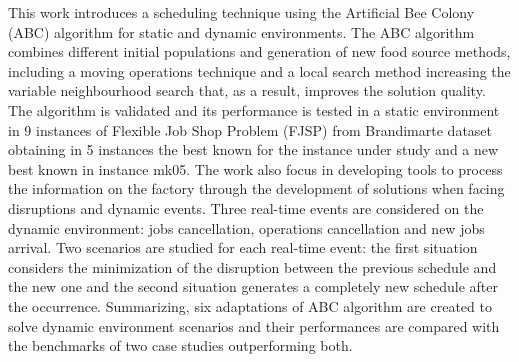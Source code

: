 
This work introduces a scheduling technique using the Artificial Bee Colony (ABC) algorithm for static and dynamic environments.
The ABC algorithm combines different initial populations and generation of new food source methods, including a moving operations technique and a local search method increasing the variable neighbourhood search that, as a result, improves the solution quality. The algorithm is validated and its performance is tested in a static environment in 9 instances of Flexible Job Shop Problem (FJSP) from Brandimarte dataset obtaining in 5 instances the best known for the instance under study and a new best known in instance mk05.  
The work also focus in developing tools to process the information on the factory through the development of solutions when facing disruptions and dynamic events. Three real-time events are considered on the dynamic environment: jobs cancellation, operations cancellation and new jobs arrival. Two scenarios are studied for each real-time event: the first situation considers the minimization of the disruption between the previous schedule and the new one and the second situation generates a completely new schedule after the occurrence. Summarizing, six adaptations of ABC algorithm are created to solve dynamic environment scenarios and their performances are compared with the benchmarks of two case studies outperforming both. 


